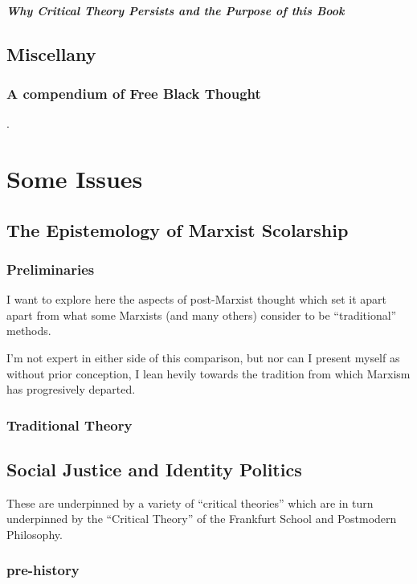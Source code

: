 \documentclass[10pt,titlepage]{book}
\begin{document}
\paragraph{Why Critical Theory Persists and the Purpose of this Book}

\section{Miscellany}

\subsection{A compendium of Free Black Thought \cite{free-black-thought}}.

\chapter{Some Issues}

\section{The Epistemology of Marxist Scolarship}

\subsection{Preliminaries}

I want to explore here the aspects of post-Marxist thought which set it apart apart from what some Marxists (and many others) consider to be ``traditional'' methods.

I'm not expert in either side of this comparison, but nor can I present myself as without prior conception, I lean hevily towards the tradition from which Marxism has progresively departed.

\subsection{Traditional Theory}


\section{Social Justice and Identity Politics}

These are underpinned by a variety of ``critical theories'' which are in turn underpinned by the ``Critical Theory'' of the Frankfurt School and Postmodern Philosophy.

\subsection{pre-history}
\end{document}
